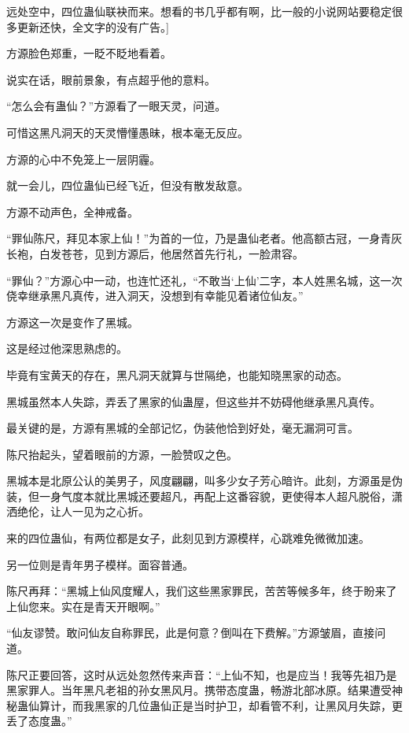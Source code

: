 
\begin{this_body}

远处空中，四位蛊仙联袂而来。想看的书几乎都有啊，比一般的小说网站要稳定很多更新还快，全文字的没有广告。]

方源脸色郑重，一眨不眨地看着。

说实在话，眼前景象，有点超乎他的意料。

“怎么会有蛊仙？”方源看了一眼天灵，问道。

可惜这黑凡洞天的天灵懵懂愚昧，根本毫无反应。

方源的心中不免笼上一层阴霾。

就一会儿，四位蛊仙已经飞近，但没有散发敌意。

方源不动声色，全神戒备。

“罪仙陈尺，拜见本家上仙！”为首的一位，乃是蛊仙老者。他高额古冠，一身青灰长袍，白发苍苍，见到方源后，他居然首先行礼，一脸肃容。

“罪仙？”方源心中一动，也连忙还礼，“不敢当‘上仙’二字，本人姓黑名城，这一次侥幸继承黑凡真传，进入洞天，没想到有幸能见着诸位仙友。”

方源这一次是变作了黑城。

这是经过他深思熟虑的。

毕竟有宝黄天的存在，黑凡洞天就算与世隔绝，也能知晓黑家的动态。

黑城虽然本人失踪，弄丢了黑家的仙蛊屋，但这些并不妨碍他继承黑凡真传。

最关键的是，方源有黑城的全部记忆，伪装他恰到好处，毫无漏洞可言。

陈尺抬起头，望着眼前的方源，一脸赞叹之色。

黑城本是北原公认的美男子，风度翩翩，叫多少女子芳心暗许。此刻，方源虽是伪装，但一身气度本就比黑城还要超凡，再配上这番容貌，更使得本人超凡脱俗，潇洒绝伦，让人一见为之心折。

来的四位蛊仙，有两位都是女子，此刻见到方源模样，心跳难免微微加速。

另一位则是青年男子模样。面容普通。

陈尺再拜：“黑城上仙风度耀人，我们这些黑家罪民，苦苦等候多年，终于盼来了上仙您来。实在是青天开眼啊。”

“仙友谬赞。敢问仙友自称罪民，此是何意？倒叫在下费解。”方源皱眉，直接问道。

陈尺正要回答，这时从远处忽然传来声音：“上仙不知，也是应当！我等先祖乃是黑家罪人。当年黑凡老祖的孙女黑风月。携带态度蛊，畅游北部冰原。结果遭受神秘蛊仙算计，而我黑家的几位蛊仙正是当时护卫，却看管不利，让黑风月失踪，更丢了态度蛊。”


\end{this_body}
